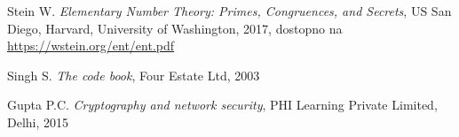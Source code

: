 \documentclass[a4paper, 12pt]{article} %
\begin{document}
\newpage
\begin{thebibliography}{9}
Stein W.
\textit{Elementary Number Theory: Primes, Congruences, and Secrets},
US San Diego, Harvard, University of Washington, 2017,
dostopno na \url{https://wstein.org/ent/ent.pdf}

Singh S.
\textit{The code book},
Four Estate Ltd, 2003

Gupta P.C. 
\textit{Cryptography and network security},
PHI Learning Private Limited, Delhi, 2015

\end{thebibliography}
\end{document}
